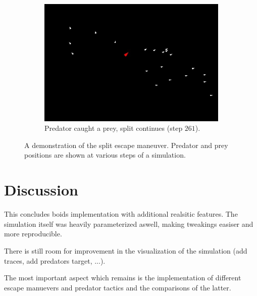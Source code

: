 \documentclass[9pt]{pnas-new}
\begin{document}
\begin{figure}[h]
    \begin{subfigure}[t]{0.3\linewidth}
        \includegraphics[width=\linewidth]{boids_step_261.jpg}
        \caption{Predator caught a prey, split continues (step $261$).}
    \end{subfigure}
    \caption{A demonstration of the split escape maneuver. Predator and prey positions
	are shown at various steps of a simulation.}
	\label{fig:sim_split}
\end{figure}


\pagebreak

\section*{Discussion}

This concludes boids implementation with additional realsitic features.
The simulation itself was heavily parameterized aswell, making tweakings easiser and more reproducible.

There is still room for improvement in the visualization of the simulation (add traces, add predators target, ...).

The most important aspect which remains is the implementation of different escape manuevers and predator tactics and the comparisons of the latter.


\showacknow %


\begin{multicols}{2}
    \section*{\bibname}
    
\end{multicols}
\end{document}
